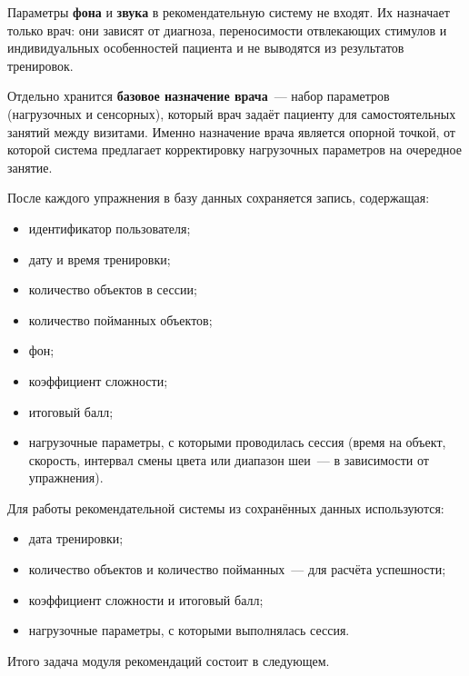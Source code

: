Параметры \textbf{фона} и \textbf{звука} в рекомендательную систему
не входят. Их назначает только врач: они зависят от диагноза,
переносимости отвлекающих стимулов и индивидуальных особенностей
пациента и не выводятся из результатов тренировок.

Отдельно хранится \textbf{базовое назначение врача}~--- набор параметров
(нагрузочных и сенсорных), который врач задаёт пациенту для
самостоятельных занятий между визитами. Именно назначение врача
является опорной точкой, от которой система предлагает корректировку
нагрузочных параметров на очередное занятие.

После каждого упражнения в базу данных сохраняется запись, содержащая:

\begin{itemize}
    \item идентификатор пользователя;
    \item дату и время тренировки;
    \item количество объектов в сессии;
    \item количество пойманных объектов;
    \item фон;
    \item коэффициент сложности;
    \item итоговый балл;
    \item нагрузочные параметры, с которыми проводилась сессия
    (время на объект, скорость, интервал смены цвета или диапазон шеи~---
    в зависимости от упражнения).
\end{itemize}

Для работы рекомендательной системы из сохранённых данных
используются:

\begin{itemize}
    \item дата тренировки;
    \item количество объектов и количество пойманных~--- для расчёта
    успешности;
    \item коэффициент сложности и итоговый балл;
    \item нагрузочные параметры, с которыми выполнялась сессия.
\end{itemize}

Итого задача модуля рекомендаций состоит в следующем.

